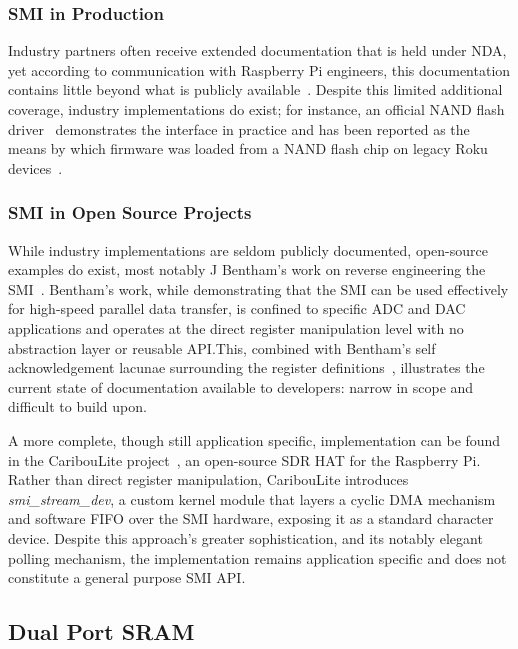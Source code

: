 \documentclass[final]{cmpreport}
\begin{document}
\subsubsection{SMI in Production}
Industry partners often receive extended documentation that is held under NDA, yet according to communication with Raspberry Pi engineers, this documentation contains little beyond what is publicly available~\cite{zotero-item-18}. Despite this limited additional coverage, industry implementations do exist; for instance, an official NAND flash driver~\cite{nandflashdriver} demonstrates the interface in practice and has been reported as the means by which firmware was loaded from a NAND flash chip on legacy Roku devices~\cite{byRaspberryPiHat2021}.

\subsubsection{SMI in Open Source Projects}
While industry implementations are seldom publicly documented, open-source examples do exist, most notably J Bentham's work on reverse engineering the SMI~\cite{iosoftcodeRaspberryPiSecondary2020}. Bentham's work, while demonstrating that the SMI can be used effectively for high-speed parallel data transfer, is confined to specific ADC and DAC applications and operates at the direct register manipulation level with no abstraction layer or reusable API.\@ This, combined with Bentham's self acknowledgement lacunae surrounding the register definitions~\cite{iosoftcodeRaspberryPiSecondary2020}, illustrates the current state of documentation available to developers: narrow in scope and difficult to build upon.

A more complete, though still application specific, implementation can be found in the CaribouLite project~\cite{CariboulabsCariboulite2026}, an open-source SDR HAT for the Raspberry Pi. Rather than direct register manipulation, CaribouLite introduces \textit{smi\_stream\_dev}, a custom kernel module that layers a cyclic DMA mechanism and software FIFO over the SMI hardware, exposing it as a standard character device. Despite this approach's greater sophistication, and its notably elegant polling mechanism, the implementation remains application specific and does not constitute a general purpose SMI API.

\subsection{Dual Port SRAM}
\end{document}
